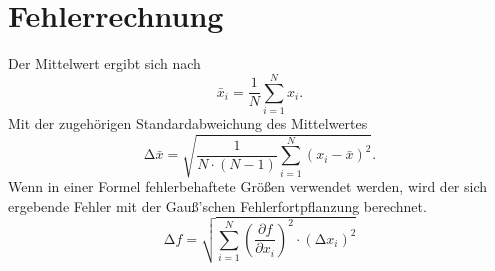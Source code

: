 \section{Fehlerrechnung}
\label{Fehlerrechnung}

Der Mittelwert ergibt sich nach
\begin{equation}
  \bar{x}_i = \frac{1}{N} \sum_{i=1}^N x_i .
  \label{eqn:Mittelwert}
\end{equation}
Mit der zugehörigen Standardabweichung des Mittelwertes
\begin{equation}
  \increment\bar{x} = \sqrt{\frac{1} {N\cdot (N-1)}
    \sum_{i=1}^N (x_i - \bar{x})^2} .
  \label{eqn:Mittelwertfehler}
\end{equation}
Wenn in einer Formel fehlerbehaftete Größen verwendet werden, wird der sich
ergebende Fehler mit der Gauß'schen Fehlerfortpflanzung berechnet.
\begin{equation}
  \increment f = \sqrt{\sum_{i=1}^N (\frac{\partial f} {\partial x_i})^2
    \cdot (\increment x_i)^2}
  \label{eqn:Gauß}
\end{equation}
